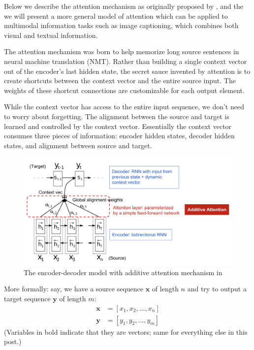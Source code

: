 Below we describe the attention mechanism as originally proposed by \citeauthor{Bahdanau2015}, and the we will present a more general model of attention which can be applied to multimodal information tasks such as image captioning, which combines both visual and textual information.

The attention mechanism was born to help memorize long source sentences in neural machine translation (NMT). Rather than building a single context vector out of the encoder’s last hidden state, the secret sauce invented by attention is to create shortcuts between the context vector and the entire source input. The weights of these shortcut connections are customizable for each output element.

While the context vector has access to the entire input sequence, we don’t need to worry about forgetting. The alignment between the source and target is learned and controlled by the context vector. Essentially the context vector consumes three pieces of information: encoder hidden states, decoder hidden states, and alignment between source and target.

\begin{figure}[hpt]
	\centering
	\includegraphics[scale=0.35]{images/ch3/bahdanau-attention.png}
	\caption{The encoder-decoder model with additive attention mechanism in \citep{Bahdanau2015}}
	\label{fig:bahdanau-attention}
\end{figure}

More formally: say, we have a source sequence $\mathbf{x}$ of length $n$ and try to output a target sequence $\mathbf{y}$ of length $m$:
$$
\begin{aligned}
\mathbf{x} &= [x_1, x_2, \dots, x_n] \\
\mathbf{y} &= [y_1, y_2, \dots, y_m]
\end{aligned}
$$
(Variables in bold indicate that they are vectors; same for everything else in this post.)

